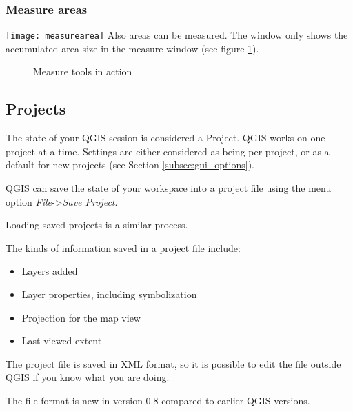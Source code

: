 \subsubsection{Measure areas}
\texttt{[image: measurearea]} Also areas can be measured. The window only shows the
accumulated area-size in the measure window (see figure \ref{fig:measure}).

\begin{figure}[h]
\caption{Measure tools in action} \label{fig:measure}
\centering
   \goodgap
\end{figure}


\subsection{Projects}\label{sec:projects}

The state of your QGIS session is considered a Project.  QGIS
works on one project at a time.  Settings are either considered
as being per-project, or as a default for new projects (see
Section \ref{subsec:gui_options}).

QGIS can save the state of your workspace into a project file using
the menu option \textit{File}->\textit{Save Project}.

Loading saved projects is a similar process.

The kinds of information saved in a project file include:

\begin{itemize}
\item Layers added
\item Layer properties, including symbolization
\item Projection for the map view
\item Last viewed extent
\end{itemize}

The project file is saved in XML format, so it is possible to edit
the file outside QGIS if you know what you are doing.  

The file format is new in version 0.8 compared to earlier QGIS versions.


%
%
